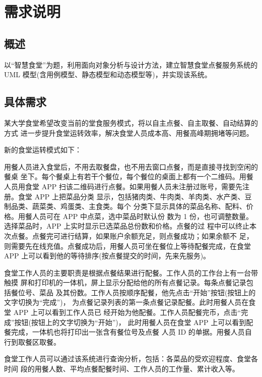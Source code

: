 \documentclass[../main.tex]{subfiles}
\begin{document}
%
\section{需求说明}
\subsection{概述}
以``智慧食堂''为题，利用面向对象分析与设计方法，建立智慧食堂点餐服务系统的
UML 模型(含用例模型、静态模型和动态模型等)，并实现该系统。
%
\subsection{具体需求}
某大学食堂希望改变当前的堂食服务模式，将以自主点餐、自主取餐、自动结算的方式
进一步提升食堂运转效率，解决食堂人员成本高、用餐高峰期拥堵等问题。

新的食堂运转模式如下：

用餐人员进入食堂后，不用去取餐盘，也不用去窗口点餐，而是直接寻找到空闲的餐桌
坐下。每个餐桌上有若干个餐位，每个餐位的桌面上都有一个二维码。用餐人员用食堂 APP
扫该二维码进行点餐。如果用餐人员未注册过账号，需要先注册。食堂 APP 上把菜品分类
显示，包括猪肉类、牛肉类、羊肉类、水产类、豆制品类、蔬菜类、鸡蛋类、主食类。每个
分类下显示具体的菜品名称、配料、价格。用餐人员可在 APP 中点菜，选中菜品时默认份
数为 1 份，也可调整数量。选择菜品时，APP 上实时显示已选菜品总份数和价格。点餐的过
程中可以终止本次点餐。点餐完可进行结算，如果账户余额充足，则点餐成功；如果余额不
足，则需要先在线充值。点餐成功后，用餐人员可坐在餐位上等待配餐完成，在食堂 APP
上可以看到他的等待排序(按点餐提交的时间，先来先服务)。

食堂工作人员的主要职责是根据点餐结果进行配餐。工作人员的工作台上有一台带触摸
屏和打印机的一体机，屏上显示分配给他的所有点餐记录。每条点餐记录包括餐位号、菜品
及其份数。工作人员按顺序配餐，他先点击``开始''按钮(按钮上的文字切换为``完成'')，
为点餐记录列表的第一条点餐记录配餐。此时用餐人员在食堂 APP 上可以看到工作人员已
经开始为他配餐。工作人员配餐完币，点击``完成''按钮(按钮上的文字切换为``开始'')，
此时用餐人员在食堂 APP 上可以看到配餐完成，一体机也将打印出一张含有餐位号及点餐
人员 ID 的单据。用餐人员自行到取餐区取餐。

食堂工作人员可以通过该系统进行查询分析，包括：各菜品的受欢迎程度、食堂各时间
段的用餐人数、平均点餐配餐时间、工作人员的工作量、累计收入等。
%
\end{document}
